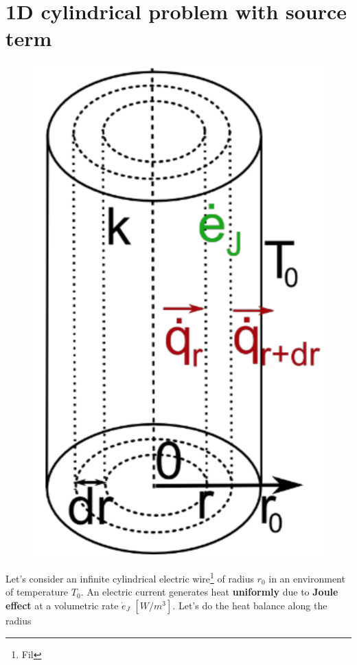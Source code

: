 \section{1D cylindrical problem with source term}
	\begin{figure}
 	\vspace{-5mm}
 	\includegraphics[scale=0.2]{ch3/11}
 	\end{figure}
	Let's consider an infinite cylindrical electric wire\footnote{Fil} of radius $r_0$ in an environment of temperature $T_0$. An electric current generates heat \textbf{uniformly} due to \textbf{Joule effect} at a volumetric rate $\dot{e}_J$ $[W/m^3]$. Let's do the heat balance along the radius
